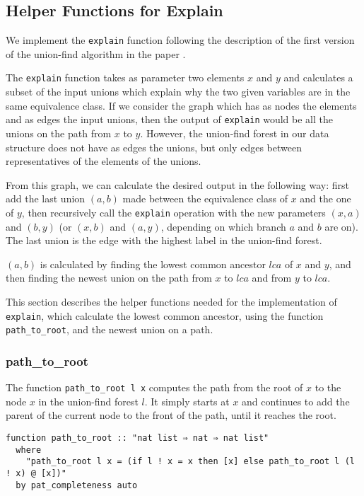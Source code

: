 \subsection{Helper Functions for Explain}

We implement the \lstinline|explain| function following the description of the first version of the union-find algorithm in the paper \cite{Nieuwenhuis}.

The \lstinline|explain| function takes as parameter two elements $x$ and $y$ and calculates a subset of the input unions which explain why the two given variables are in the same equivalence class. If we consider the graph which has as nodes the elements and as edges the input unions, then the output of \lstinline|explain| would be all the unions on the path from $x$ to $y$. However, the union-find forest in our data structure does not have as edges the unions, but only edges between representatives of the elements of the unions.

From this graph, we can calculate the desired output in the following way: first add the last union $(a, b)$ made between the equivalence class of $x$ and the one of $y$, then recursively call the \lstinline|explain| operation with the new parameters $(x, a)$ and $(b, y)$ (or $(x, b)$ and $(a, y)$, depending on which branch $a$ and $b$ are on). The last union is the edge with the highest label in the union-find forest.

$(a, b)$ is calculated by finding the lowest common ancestor $lca$ of $x$ and $y$, and then finding the newest union on the path from $x$ to $lca$ and from $y$ to $lca$.

This section describes the helper functions needed for the implementation of \lstinline|explain|, which calculate the lowest common ancestor, using the function \lstinline{path_to_root}, and the newest union on a path.

\subsubsection{path\_to\_root}
\label{subsubsection:path-to-root}

The function \lstinline{path_to_root l x} computes the path from the root of $x$ to the node $x$ in the union-find forest $l$. It simply starts at $x$ and continues to add the parent of the current node to the front of the path, until it reaches the root.

\begin{lstlisting}
function path_to_root :: "nat list ⇒ nat ⇒ nat list"
  where
    "path_to_root l x = (if l ! x = x then [x] else path_to_root l (l ! x) @ [x])"
  by pat_completeness auto
\end{lstlisting}

